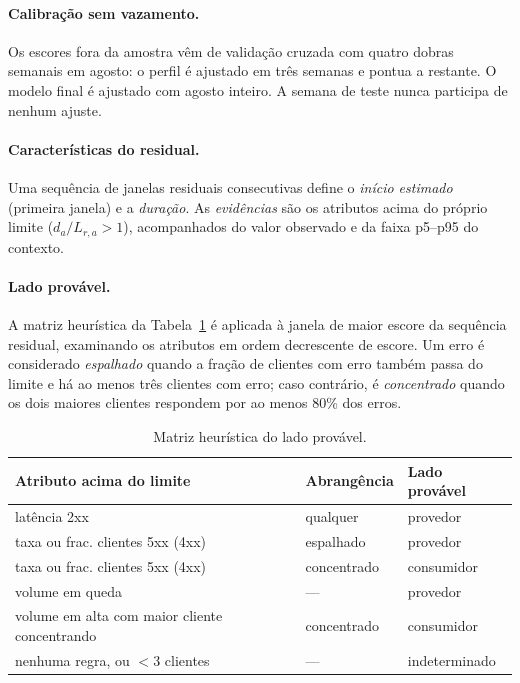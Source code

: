 \documentclass[sigconf,nonacm]{acmart}
\begin{document}
\paragraph{Calibração sem vazamento.} Os escores fora da amostra vêm de validação cruzada com quatro dobras semanais em agosto: o perfil é ajustado em três semanas e pontua a restante. O modelo final é ajustado com agosto inteiro. A semana de teste nunca participa de nenhum ajuste.

\paragraph{Características do residual.} Uma sequência de janelas residuais consecutivas define o \emph{início estimado} (primeira janela) e a \emph{duração}. As \emph{evidências} são os atributos acima do próprio limite ($d_a/L_{r,a}>1$), acompanhados do valor observado e da faixa p5--p95 do contexto.

\paragraph{Lado provável.} A matriz heurística da Tabela~\ref{tab:lado} é aplicada à janela de maior escore da sequência residual, examinando os atributos em ordem decrescente de escore. Um erro é considerado \emph{espalhado} quando a fração de clientes com erro também passa do limite e há ao menos três clientes com erro; caso contrário, é \emph{concentrado} quando os dois maiores clientes respondem por ao menos 80\% dos erros.

\begin{table}[t]
  \caption{Matriz heurística do lado provável.}
  \label{tab:lado}
  \small
  \begin{tabular}{p{}p{}p{}}
    \toprule
    Atributo acima do limite & Abrangência & Lado provável \\
    \midrule
    latência 2xx & qualquer & provedor \\
    taxa ou frac. clientes 5xx (4xx) & espalhado & provedor \\
    taxa ou frac. clientes 5xx (4xx) & concentrado & consumidor \\
    volume em queda & --- & provedor \\
    volume em alta com maior cliente concentrando & concentrado & consumidor \\
    nenhuma regra, ou $<3$ clientes & --- & indeterminado \\
    \bottomrule
  \end{tabular}
\end{table}
\end{document}
